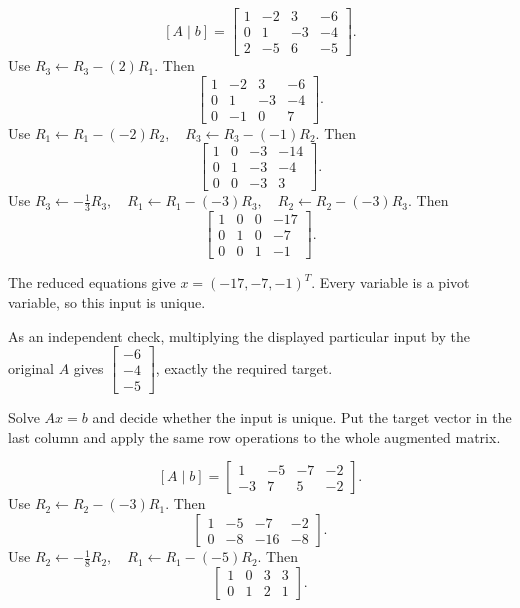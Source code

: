 \[ [A\mid b]=\begin{bmatrix}1 & -2 & 3 & -6\\0 & 1 & -3 & -4\\2 & -5 & 6 & -5\end{bmatrix}.\]
Use $R_{3}\leftarrow R_{3}-(2)R_{1}$. Then
\[ \begin{bmatrix}1 & -2 & 3 & -6\\0 & 1 & -3 & -4\\0 & -1 & 0 & 7\end{bmatrix}.\]
Use $R_{1}\leftarrow R_{1}-(-2)R_{2},\quad R_{3}\leftarrow R_{3}-(-1)R_{2}$. Then
\[ \begin{bmatrix}1 & 0 & -3 & -14\\0 & 1 & -3 & -4\\0 & 0 & -3 & 3\end{bmatrix}.\]
Use $R_{3}\leftarrow - \frac{1}{3}R_{3},\quad R_{1}\leftarrow R_{1}-(-3)R_{3},\quad R_{2}\leftarrow R_{2}-(-3)R_{3}$. Then
\[ \begin{bmatrix}1 & 0 & 0 & -17\\0 & 1 & 0 & -7\\0 & 0 & 1 & -1\end{bmatrix}.\]

The reduced equations give $x=(-17,-7,-1)^T$. Every variable is a pivot variable, so this input is unique.

As an independent check, multiplying the displayed particular input by the original $A$ gives $\begin{bmatrix}-6\\-4\\-5\end{bmatrix}$, exactly the required target.



\goal Solve $Ax=b$ and decide whether the input is unique. Put the target vector in the last column and apply the same row operations to the whole augmented matrix.

\[ [A\mid b]=\begin{bmatrix}1 & -5 & -7 & -2\\-3 & 7 & 5 & -2\end{bmatrix}.\]
Use $R_{2}\leftarrow R_{2}-(-3)R_{1}$. Then
\[ \begin{bmatrix}1 & -5 & -7 & -2\\0 & -8 & -16 & -8\end{bmatrix}.\]
Use $R_{2}\leftarrow - \frac{1}{8}R_{2},\quad R_{1}\leftarrow R_{1}-(-5)R_{2}$. Then
\[ \begin{bmatrix}1 & 0 & 3 & 3\\0 & 1 & 2 & 1\end{bmatrix}.\]


